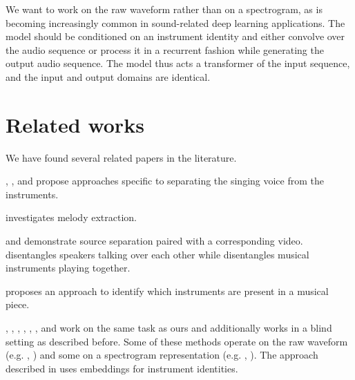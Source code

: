 \documentclass[twocolumn,superscriptaddress,aps]{revtex4-1}
\begin{document}
We want to work on the raw waveform rather than on a spectrogram, as is becoming increasingly common in sound-related deep learning applications. The model should be conditioned on an instrument identity and either convolve over the audio sequence or process it in a recurrent fashion while generating the output audio sequence. The model thus acts a transformer of the input sequence, and the input and output domains are identical.

\section{Related works}
We have found several related papers in the literature. 

\cite{1803.00702}, \cite{1804.08300}, \cite{1804.09202} and \cite{1504.04658} propose approaches specific to separating the singing voice from the instruments. 

\cite{1810.12947} investigates melody extraction.

\cite{1804.03160} and \cite{1804.04121} demonstrate source separation paired with a corresponding video. \cite{1804.03160} disentangles speakers talking over each other while \cite{1804.04121} disentangles musical instruments playing together.

\cite{1511.05520} proposes an approach to identify which instruments are present in a musical piece.

\cite{1901.05061}, \cite{1811.03076}, \cite{1810.12187}, \cite{1807.02710}, \cite{1807.01898}, \cite{1806.10307}, \cite{1806.03185} and \cite{1805.08559} work on the same task as ours and \cite{1806.00273} additionally works in a blind setting as described before. Some of these methods operate on the raw waveform (e.g. \cite{1811.03076}, \cite{1810.12187}) and some on a spectrogram representation (e.g. \cite{1807.02710}, \cite{1805.08559}). The approach described in \cite{1811.03076} uses embeddings for instrument identities.




\clearpage


\end{document}

